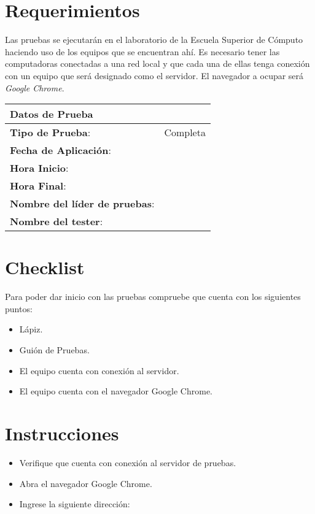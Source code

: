 \section{Requerimientos}
\noindent
Las pruebas se ejecutarán en el laboratorio de la Escuela Superior de Cómputo haciendo uso de los equipos que se encuentran ahí. Es necesario tener las computadoras conectadas a una red local y que cada una de ellas tenga conexión con un equipo que será designado como el servidor. El navegador a ocupar será \textit{Google Chrome}.
\begin{longtable}{ | p{8cm} | p{7cm} | }
\hline
\multicolumn{2}{|p{15cm}|}{\textbf{Datos de Prueba}}\\
\hline
\textbf{Tipo de Prueba}: & Completa\\
\hline
\textbf{Fecha de Aplicación}: & \\
\hline
\textbf{Hora Inicio}: & \\
\hline
\textbf{Hora Final}: & \\
\hline
\textbf{Nombre del líder de pruebas}: & \\
\hline
\textbf{Nombre del tester}: & \\
\hline
\end{longtable}
\section{Checklist}
\noindent
Para poder dar inicio con las pruebas compruebe que cuenta con los siguientes puntos: \begin{itemize}
    \item Lápiz.
    \item Guión de Pruebas.
    \item El equipo cuenta con conexión al servidor.
    \item El equipo cuenta con el navegador Google Chrome.
\end{itemize}
\section{Instrucciones}
\begin{itemize}
    \item Verifique que cuenta con conexión al servidor de pruebas.
    \item Abra el navegador Google Chrome.
    \item Ingrese la siguiente dirección: 
\end{itemize}